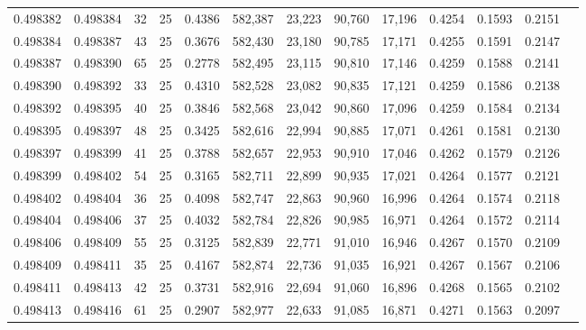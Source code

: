 \begin{tabular}{rrrrrrrrrrrrr}
0.498382 & 0.498384 &    32 &  25 &                                     0.4386 & 582,387 &  23,223 &  90,760 &  17,196 & 0.4254 & 0.1593 & 0.2151 \\
0.498384 & 0.498387 &    43 &  25 &                                     0.3676 & 582,430 &  23,180 &  90,785 &  17,171 & 0.4255 & 0.1591 & 0.2147 \\
0.498387 & 0.498390 &    65 &  25 &                                     0.2778 & 582,495 &  23,115 &  90,810 &  17,146 & 0.4259 & 0.1588 & 0.2141 \\
0.498390 & 0.498392 &    33 &  25 &                                     0.4310 & 582,528 &  23,082 &  90,835 &  17,121 & 0.4259 & 0.1586 & 0.2138 \\
0.498392 & 0.498395 &    40 &  25 &                                     0.3846 & 582,568 &  23,042 &  90,860 &  17,096 & 0.4259 & 0.1584 & 0.2134 \\
0.498395 & 0.498397 &    48 &  25 &                                     0.3425 & 582,616 &  22,994 &  90,885 &  17,071 & 0.4261 & 0.1581 & 0.2130 \\
0.498397 & 0.498399 &    41 &  25 &                                     0.3788 & 582,657 &  22,953 &  90,910 &  17,046 & 0.4262 & 0.1579 & 0.2126 \\
0.498399 & 0.498402 &    54 &  25 &                                     0.3165 & 582,711 &  22,899 &  90,935 &  17,021 & 0.4264 & 0.1577 & 0.2121 \\
0.498402 & 0.498404 &    36 &  25 &                                     0.4098 & 582,747 &  22,863 &  90,960 &  16,996 & 0.4264 & 0.1574 & 0.2118 \\
0.498404 & 0.498406 &    37 &  25 &                                     0.4032 & 582,784 &  22,826 &  90,985 &  16,971 & 0.4264 & 0.1572 & 0.2114 \\
0.498406 & 0.498409 &    55 &  25 &                                     0.3125 & 582,839 &  22,771 &  91,010 &  16,946 & 0.4267 & 0.1570 & 0.2109 \\
0.498409 & 0.498411 &    35 &  25 &                                     0.4167 & 582,874 &  22,736 &  91,035 &  16,921 & 0.4267 & 0.1567 & 0.2106 \\
0.498411 & 0.498413 &    42 &  25 &                                     0.3731 & 582,916 &  22,694 &  91,060 &  16,896 & 0.4268 & 0.1565 & 0.2102 \\
0.498413 & 0.498416 &    61 &  25 &                                     0.2907 & 582,977 &  22,633 &  91,085 &  16,871 & 0.4271 & 0.1563 & 0.2097 \\

\end{tabular}
